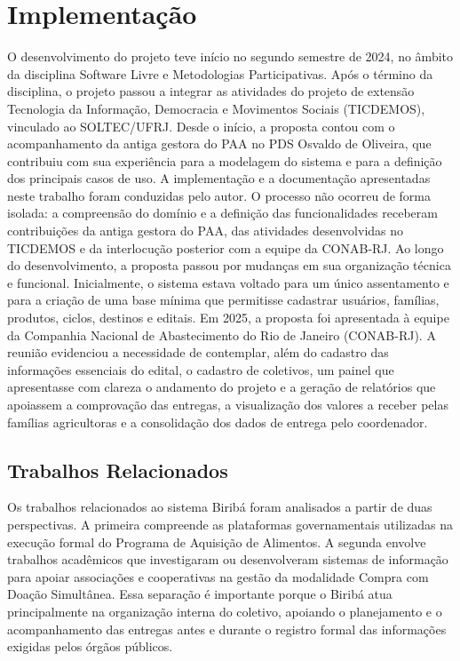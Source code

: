 \chapter{Implementação}
\label{chap5}

O desenvolvimento do projeto teve início no segundo semestre de 2024, no âmbito da disciplina Software Livre e Metodologias Participativas. Após o término da disciplina, o projeto passou a integrar as atividades do projeto de extensão Tecnologia da Informação, Democracia e Movimentos Sociais (TICDEMOS), vinculado ao SOLTEC/UFRJ. Desde o início, a proposta contou com o acompanhamento da antiga gestora do PAA no PDS Osvaldo de Oliveira, que contribuiu com sua experiência para a modelagem do sistema e para a definição dos principais casos de uso.
A implementação e a documentação apresentadas neste trabalho foram conduzidas pelo autor. O processo não ocorreu de forma isolada: a compreensão do domínio e a definição das funcionalidades receberam contribuições da antiga gestora do PAA, das atividades desenvolvidas no TICDEMOS e da interlocução posterior com a equipe da CONAB-RJ.
Ao longo do desenvolvimento, a proposta passou por mudanças em sua organização técnica e funcional. Inicialmente, o sistema estava voltado para um único assentamento e para a criação de uma base mínima que permitisse cadastrar usuários, famílias, produtos, ciclos, destinos e editais. Em 2025, a proposta foi apresentada à equipe da Companhia Nacional de Abastecimento do Rio de Janeiro (CONAB-RJ). A reunião evidenciou a necessidade de contemplar, além do cadastro das informações essenciais do edital, o cadastro de coletivos, um painel que apresentasse com clareza o andamento do projeto e a geração de relatórios que apoiassem a comprovação das entregas, a visualização dos valores a receber pelas famílias agricultoras e a consolidação dos dados de entrega pelo coordenador.

\section{Trabalhos Relacionados}

Os trabalhos relacionados ao sistema Biribá foram analisados a partir de duas perspectivas. A primeira compreende as plataformas governamentais utilizadas na execução formal do Programa de Aquisição de Alimentos. A segunda envolve trabalhos acadêmicos que investigaram ou desenvolveram sistemas de informação para apoiar associações e cooperativas na gestão da modalidade Compra com Doação Simultânea. Essa separação é importante porque o Biribá atua principalmente na organização interna do coletivo, apoiando o planejamento e o acompanhamento das entregas antes e durante o registro formal das informações exigidas pelos órgãos públicos.

